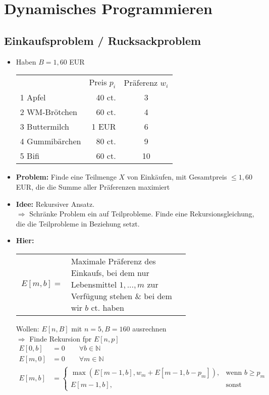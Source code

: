 \section{Dynamisches Programmieren}
\subsection{Einkaufsproblem / Rucksackproblem}
\begin{itemize}
 \item Haben $B = 1{,}60$ EUR
        \begin{center}
            \begin{tabular}{lr|c}
                & Preis $p_i$ & Präferenz $w_i$ \\
                1 Apfel & 40 ct. & 3 \\
                2 WM-Brötchen & 60 ct. & 4 \\
                3 Buttermilch & 1 EUR & 6 \\
                4 Gummibärchen & 80 ct. & 9 \\
                5 Bifi & 60 ct. & 10 \\ 
            \end{tabular}
        \end{center}
 \item \textbf{Problem:} Finde eine Teilmenge $X$ von Einkäufen, mit Gesamtpreis $\leq 1{,}60$ EUR, die die Summe aller Präferenzen maximiert
 \item \textbf{Idee:} Rekursiver Ansatz. \\
    $\Rightarrow$ Schränke Problem ein auf Teilprobleme. Finde eine Rekursionsgleichung, die die Teilprobleme in Beziehung setzt.
 \item \textbf{Hier:}
   \begin{center}
    \begin{tabular}{rp{0.7\linewidth}}
     $E[m,b] =$ & Maximale Präferenz des Einkaufs, bei dem nur Lebensmittel $1,...,m$ zur Verfügung stehen \& bei dem wir $b$ ct. haben
    \end{tabular}
   \end{center}
    Wollen: $E[n,B]$ mit $n = 5, B = 160$ ausrechnen\\
    $\Rightarrow$ Finde Rekursion fpr $E[n,p]$
    \begin{align*}
     E[0,b] &= 0 \qquad \forall b \in \mathbb{N} \\
     E[m,0] &= 0 \qquad \forall m \in \mathbb{N} \\
     E[m,b] &= \begin{cases}
                \max(E[m-1,b], w_m + E[m-1, b-p_m]), & \text{wenn } b \geq p_m \\
                E[m-1,b], & \text{sonst}
               \end{cases}
    \end{align*}
\end{itemize}
